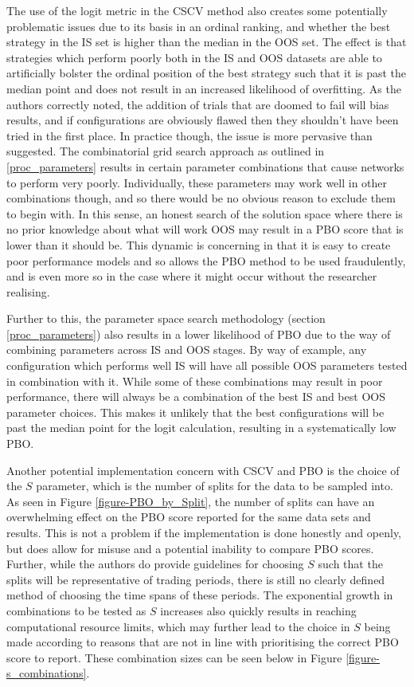 \documentclass[a4paper,11pt,oneside]{article}
\theoremstyle{plain}
\theoremstyle{definition}
\begin{document}
The use of the logit metric in the CSCV method also creates some potentially problematic issues due to its basis in an ordinal ranking, and whether the best strategy in the IS set is higher than the median in the OOS set. The effect is that strategies which perform poorly both in the IS and OOS datasets are able to artificially bolster the ordinal position of the best strategy such that it is past the median point and does not result in an increased likelihood of overfitting. As the authors correctly noted, the addition of trials that are doomed to fail will bias results, and if configurations are obviously flawed then they shouldn't have been tried in the first place. In practice though, the issue is more pervasive than suggested. The combinatorial grid search approach as outlined in \ref{proc_parameters} results in certain parameter combinations that cause networks to perform very poorly. Individually, these parameters may work well in other combinations though, and so there would be no obvious reason to exclude them to begin with. In this sense, an honest search of the solution space where there is no prior knowledge about what will work OOS may result in a PBO score that is lower than it should be. This dynamic is concerning in that it is easy to create poor performance models and so allows the PBO method to be used fraudulently, and is even more so in the case where it might occur without the researcher realising. \newline

Further to this, the parameter space search methodology (section \ref{proc_parameters}) also results in a lower likelihood of PBO due to the way of combining parameters across IS and OOS stages. By way of example, any configuration which performs well IS will have all possible OOS parameters tested in combination with it. While some of these combinations may result in poor performance, there will always be a combination of the best IS and best OOS parameter choices. This makes it unlikely that the best configurations will be past the median point for the logit calculation, resulting in a systematically low PBO.\newline

Another potential implementation concern with CSCV and PBO is the choice of the $S$ parameter, which is the number of splits for the data to be sampled into. As seen in Figure \ref{figure-PBO_by_Split}, the number of splits can have an overwhelming effect on the PBO score reported for the same data sets and results. This is not a problem if the implementation is done honestly and openly, but does allow for misuse and a potential inability to compare PBO scores. Further, while the authors do provide guidelines for choosing $S$ such that the splits will be representative of trading periods, there is still no clearly defined method of choosing the time spans of these periods. The exponential growth in combinations to be tested as $S$ increases also quickly results in reaching computational resource limits, which may further lead to the choice in $S$ being made according to reasons that are not in line with prioritising the correct PBO score to report. These combination sizes can be seen below in Figure \ref{figure-s_combinations}.
\end{document}
